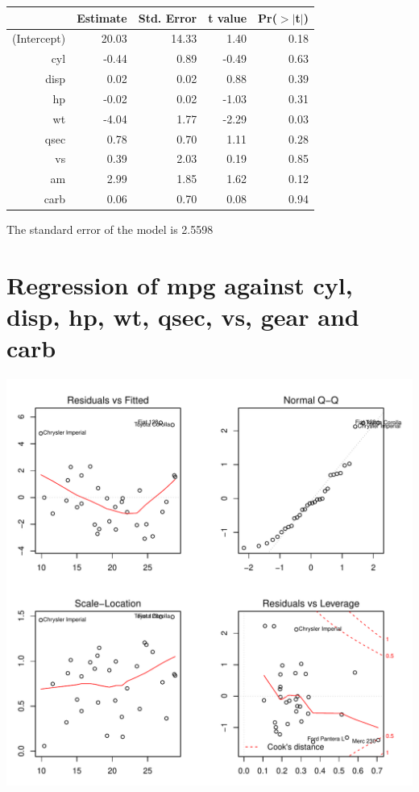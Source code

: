 \documentclass{article}\usepackage[]{graphicx}\usepackage[]{color}
\makeatletter
\def\maxwidth{ %
  \ifdim\Gin@nat@width>\linewidth
    \linewidth
  \else
    \Gin@nat@width
  \fi
}
\newenvironment{knitrout}{}{} %
\makeatother
\begin{document}
\begin{table}[ht]
\centering
\begin{tabular}{rrrrr}
  \hline
 & Estimate & Std. Error & t value & Pr($>$$|$t$|$) \\ 
  \hline
(Intercept) & 20.03 & 14.33 & 1.40 & 0.18 \\ 
  cyl & -0.44 & 0.89 & -0.49 & 0.63 \\ 
  disp & 0.02 & 0.02 & 0.88 & 0.39 \\ 
  hp & -0.02 & 0.02 & -1.03 & 0.31 \\ 
  wt & -4.04 & 1.77 & -2.29 & 0.03 \\ 
  qsec & 0.78 & 0.70 & 1.11 & 0.28 \\ 
  vs & 0.39 & 2.03 & 0.19 & 0.85 \\ 
  am & 2.99 & 1.85 & 1.62 & 0.12 \\ 
  carb & 0.06 & 0.70 & 0.08 & 0.94 \\ 
   \hline
\end{tabular}
\end{table}




The standard error of the model is 2.5598

\newpage

\section{Regression of mpg against cyl, disp, hp, wt, qsec, vs, gear and carb }
\begin{knitrout}
\color{fgcolor}

{\centering \includegraphics[width=\maxwidth]{figure/lm-cyl-disp-hp-wt-qsec-vs-gear-carb} 

}



\end{knitrout}
\end{document}
